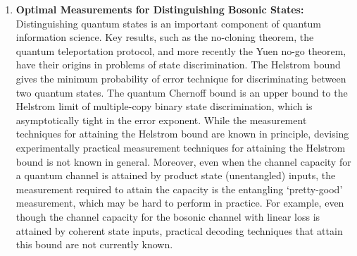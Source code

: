\begin{enumerate}
    \item \textbf{Optimal Measurements for Distinguishing Bosonic States:} Distinguishing quantum states is an important component of quantum information science. Key results, such as the no-cloning theorem, the quantum teleportation protocol, and more recently the Yuen no-go theorem, have their origins in problems of state discrimination. The Helstrom bound gives the minimum probability of error technique for discriminating between two quantum states. The quantum Chernoff bound is an upper bound to the Helstrom limit of multiple-copy binary state discrimination, which is asymptotically tight in the error exponent. While the measurement techniques for attaining the Helstrom bound are known in principle, devising experimentally practical measurement techniques for attaining the Helstrom bound is not known in general. Moreover, even when the channel capacity for a quantum channel is attained by product state (unentangled) inputs, the measurement required to attain the capacity is the entangling `pretty-good' measurement, which may be hard to perform in practice. For example, even though the channel capacity for the bosonic channel with linear loss is attained by coherent state inputs, practical decoding techniques that attain this bound are not currently known.

\end{enumerate}
